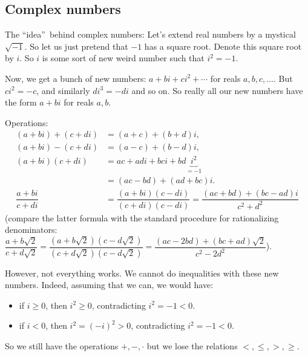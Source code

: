 \documentclass[numbers=enddot,12pt,final,onecolumn,notitlepage]{scrartcl}%
\numberwithin{exer}{subsection}
\theoremstyle{definition}
\begin{document}
\subsection{Complex numbers}

The \textquotedblleft idea\textquotedblright\ behind complex numbers: Let's
extend real numbers by a mystical $\sqrt{-1}$. So let us just pretend that
$-1$ has a square root. Denote this square root by $i$. So $i$ is some sort of
new weird number such that $i^{2}=-1$.

Now, we get a bunch of new numbers: $a+bi+ci^{2}+\cdots$ for reals
$a,b,c,\ldots$. But $ci^{2}=-c$, and similarly $di^{3}=-di$ and so on. So
really all our new numbers have the form $a+bi$ for reals $a,b$.

Operations:%
\begin{align*}
\left(  a+bi\right)  +\left(  c+di\right)    & =\left(  a+c\right)  +\left(
b+d\right)  i,\\
\left(  a+bi\right)  -\left(  c+di\right)    & =\left(  a-c\right)  +\left(
b-d\right)  i,\\
\left(  a+bi\right)  \left(  c+di\right)    & =ac+adi+bci+bd\underbrace{i^{2}%
}_{=-1}\\
& =\left(  ac-bd\right)  +\left(  ad+bc\right)  i.\\
\dfrac{a+bi}{c+di}  & =\dfrac{\left(  a+bi\right)  \left(  c-di\right)
}{\left(  c+di\right)  \left(  c-di\right)  }=\dfrac{\left(  ac+bd\right)
+\left(  bc-ad\right)  i}{c^{2}+d^{2}}%
\end{align*}
(compare the latter formula with the standard procedure for rationalizing
denominators: $\dfrac{a+b\sqrt{2}}{c+d\sqrt{2}}=\dfrac{\left(  a+b\sqrt
{2}\right)  \left(  c-d\sqrt{2}\right)  }{\left(  c+d\sqrt{2}\right)  \left(
c-d\sqrt{2}\right)  }=\dfrac{\left(  ac-2bd\right)  +\left(  bc+ad\right)
\sqrt{2}}{c^{2}-2d^{2}}$).

However, not everything works. We cannot do inequalities with these new
numbers. Indeed, assuming that we can, we would have:

\begin{itemize}
\item if $i\geq0$, then $i^{2}\geq0$, contradicting $i^{2}=-1<0$.

\item if $i<0$, then $i^{2}=\left(  -i\right)  ^{2}>0$, contradicting
$i^{2}=-1<0$.
\end{itemize}

So we still have the operations $+,-,\cdot$ but we lose the relations
$<,\leq,>,\geq$.
\end{document}
